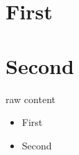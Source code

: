 \section{First}
\section{Second}
\begin{custom}
  \begin{inner}
    raw content
  \end{inner}
\end{custom}
\begin{itemize}
  \item First
  \item Second
\end{itemize}
